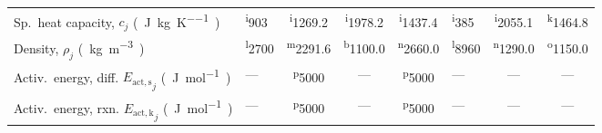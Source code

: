 \begin{table}[!htbp]
\begin{threeparttable}
{\begin{tabular}{@{} l l c c c l c r @{}}
                Sp.\ heat capacity, $c_j$ \si{(\joule\per\kilogram\per\kelvin)}  & \textsuperscript{i}903  & \textsuperscript{i}1269.2 & \textsuperscript{i}1978.2 & \textsuperscript{i}1437.4 & \textsuperscript{i}385  & \textsuperscript{i}2055.1 & \textsuperscript{k}1464.8         \\
                Density, $\rho_j$ \si{(kg.m^{-3})}                             & \textsuperscript{l}2700 & \textsuperscript{m}2291.6 & \textsuperscript{b}1100.0 & \textsuperscript{n}2660.0 & \textsuperscript{l}8960 & \textsuperscript{n}1290.0 & \textsuperscript{o}1150.0         \\
                Activ.\ energy, diff. ${E_\mathrm{act,s}}_j$ \si{(J.mol^{-1})} & ---           & \textsuperscript{p}5000   & ---             & \textsuperscript{p}5000   & ---           & ---             & \multicolumn{1}{c}{---} \\
                Activ.\ energy, rxn. ${E_\mathrm{act,k}}_j$ \si{(J.mol^{-1})}  & ---           & \textsuperscript{p}5000   & ---             & \textsuperscript{p}5000   & ---           & ---             & \multicolumn{1}{c}{---} \\

                \midrule
            \end{tabular}
        }


\end{threeparttable}
\end{table}

